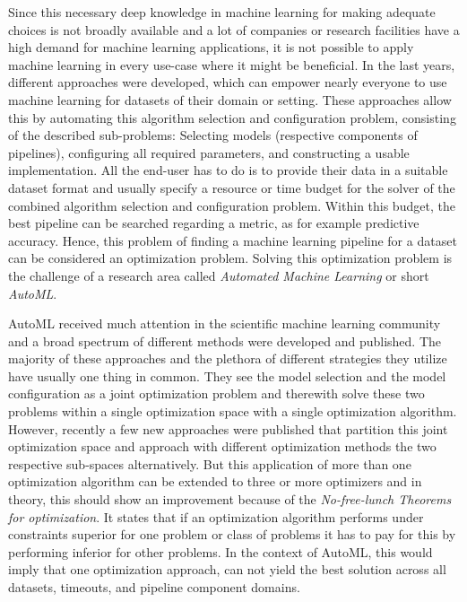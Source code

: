 Since this necessary deep knowledge in machine learning for making adequate choices is not broadly available and a lot of companies or research facilities have a high demand for machine learning applications, it is not possible to apply machine learning in every use-case where it might be beneficial.\newline
In the last years, different approaches were developed, which can empower nearly everyone to use machine learning for datasets of their domain or setting.
These approaches allow this by automating this algorithm selection and configuration problem, consisting of the described sub-problems: Selecting models (respective components of pipelines), configuring all required parameters, and constructing a usable implementation.
All the end-user has to do is to provide their data in a suitable dataset format and usually specify a resource or time budget for the solver of the combined algorithm selection and configuration problem.\newline
Within this budget, the best pipeline can be searched regarding a metric, as for example predictive accuracy.
Hence, this problem of finding a machine learning pipeline for a dataset can be considered an optimization problem.
Solving this optimization problem is the challenge of a research area called \textit{Automated Machine Learning} or short \textit{AutoML}.

AutoML received much attention in the scientific machine learning community and a broad spectrum of different methods were developed and published.
The majority of these approaches and the plethora of different strategies they utilize have usually one thing in common.
They see the model selection and the model configuration as a joint optimization problem and therewith solve these two problems within a single optimization space with a single optimization algorithm.\newline
However, recently a few new approaches were published that partition this joint optimization space and approach with different optimization methods the two respective sub-spaces alternatively.
But this application of more than one optimization algorithm can be extended to three or more optimizers and in theory, this should show an improvement because of the \textit{No-free-lunch Theorems for optimization}.
It states that if an optimization algorithm performs under constraints superior for one problem or class of problems it has to pay for this by performing inferior for other problems.
In the context of AutoML, this would imply that one optimization approach, can not yield the best solution across all datasets, timeouts, and pipeline component domains.

